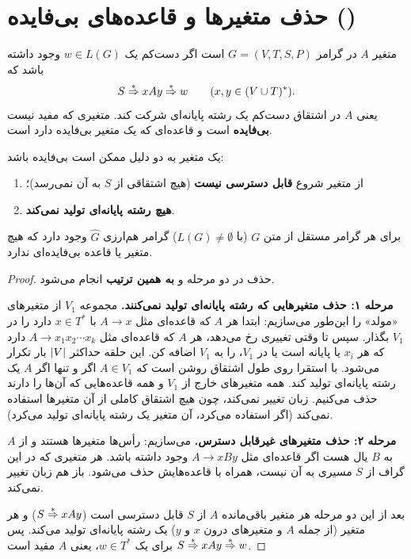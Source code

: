 \section{حذف متغیرها و قاعده‌های بی‌فایده ()}

\begin{definition}
متغیر $A$ در گرامر $G=(V,T,S,P)$  است اگر دست‌کم یک $w\in L(G)$ وجود داشته باشد که
\[S\overset{*}{\Rightarrow} xAy\overset{*}{\Rightarrow} w\qquad (x,y\in(V\cup T)^*).\]
یعنی $A$ در اشتقاق دست‌کم یک رشته پایانه‌ای شرکت کند. متغیری که مفید نیست \textbf{بی‌فایده} است و قاعده‌ای که یک متغیر بی‌فایده دارد  است.
\end{definition}

یک متغیر به دو دلیل ممکن است بی‌فایده باشد:
\begin{enumerate}
\item از متغیر شروع \textbf{قابل دسترسی نیست} (هیچ اشتقاقی از $S$ به آن نمی‌رسد)؛
\item \textbf{هیچ رشته پایانه‌ای تولید نمی‌کند}.
\end{enumerate}

\begin{theorem}
برای هر گرامر مستقل از متن $G$ (با $L(G)\neq\emptyset$) گرامر هم‌ارزی $\widehat G$ وجود دارد که هیچ متغیر یا قاعده بی‌فایده‌ای ندارد.
\end{theorem}

\begin{proof}
حذف در دو مرحله و \textbf{به همین ترتیب} انجام می‌شود.

\textbf{مرحله ۱: حذف متغیرهایی که رشته پایانه‌ای تولید نمی‌کنند.} مجموعه $V_1$ از متغیرهای «مولد» را این‌طور می‌سازیم: ابتدا هر $A$ که قاعده‌ای مثل $A\to x$ با $x\in T^*$ دارد را در $V_1$ بگذار. سپس تا وقتی تغییری رخ می‌دهد، هر $A$ که قاعده‌ای مثل $A\to x_1x_2\cdots x_k$ دارد که هر $x_i$ یا پایانه است یا در $V_1$، را به $V_1$ اضافه کن. این حلقه حداکثر $\lvert V\rvert$ بار تکرار می‌شود. با استقرا روی طول اشتقاق روشن است که $A\in V_1$ اگر و تنها اگر $A$ یک رشته پایانه‌ای تولید کند. همه متغیرهای خارج از $V_1$ و همه قاعده‌هایی که آن‌ها را دارند حذف می‌کنیم. زبان تغییر نمی‌کند، چون هیچ اشتقاق کاملی از آن متغیرها استفاده نمی‌کند (اگر استفاده می‌کرد، آن متغیر یک رشته پایانه‌ای تولید می‌کرد).

\textbf{مرحله ۲: حذف متغیرهای غیرقابل دسترس.}  می‌سازیم: رأس‌ها متغیرها هستند و از $A$ به $B$ یال هست اگر قاعده‌ای مثل $A\to xBy$ وجود داشته باشد. هر متغیری که در این گراف از $S$ مسیری به آن نیست، همراه با قاعده‌هایش حذف می‌شود. باز هم زبان تغییر نمی‌کند.

بعد از این دو مرحله هر متغیر باقی‌مانده $A$ از $S$ قابل دسترسی است ($S\overset{*}{\Rightarrow} xAy$) و هر متغیر (از جمله $A$ و متغیرهای درون $x$ و $y$) یک رشته پایانه‌ای تولید می‌کند. پس $S\overset{*}{\Rightarrow} xAy\overset{*}{\Rightarrow} w$ برای یک $w\in T^*$، یعنی $A$ مفید است.
\end{proof}

